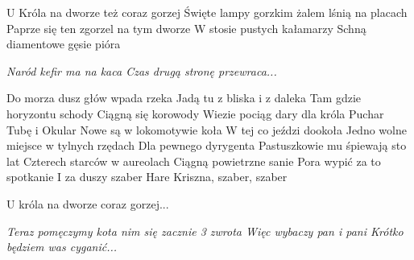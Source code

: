 \documentclass[../../../songbook.tex]{subfiles}
\begin{document}
\begin{multicols}{2}
{\-\hspace{0.4cm} U Króla na dworze też coraz gorzej \newline
\-\hspace{0.4cm} Święte lampy gorzkim żalem lśnią na placach  \newline
\-\hspace{0.4cm} Paprze się ten zgorzel na tym dworze \newline
\-\hspace{0.4cm} W stosie pustych kałamarzy  \newline
\-\hspace{0.4cm} Schną diamentowe gęsie pióra \newline

\textit{Naród kefir ma na kaca \newline
Czas drugą stronę przewraca...} \newline

Do morza dusz głów wpada rzeka \newline
Jadą tu z bliska i z daleka \newline
Tam gdzie horyzontu schody \newline
Ciągną się korowody \newline
Wiezie pociąg dary dla króla \newline
Puchar Tubę i Okular \newline
Nowe są w lokomotywie koła  \newline
W tej co jeździ dookoła \newline
Jedno wolne miejsce w tylnych rzędach \newline
Dla pewnego dyrygenta \newline
Pastuszkowie mu śpiewają sto lat \newline
Czterech starców w aureolach \newline
Ciągną powietrzne sanie \newline
Pora wypić za to spotkanie \newline
I za duszy szaber \newline
Hare Kriszna, szaber, szaber \newline

\-\hspace{0.4cm} U króla na dworze coraz gorzej... \newline

\textit{Teraz pomęczymy kota nim się zacznie 3 zwrota \newline
Więc wybaczy pan i pani \newline
Krótko będziem was cyganić...} \newline

}
\end{multicols}
\end{document}
